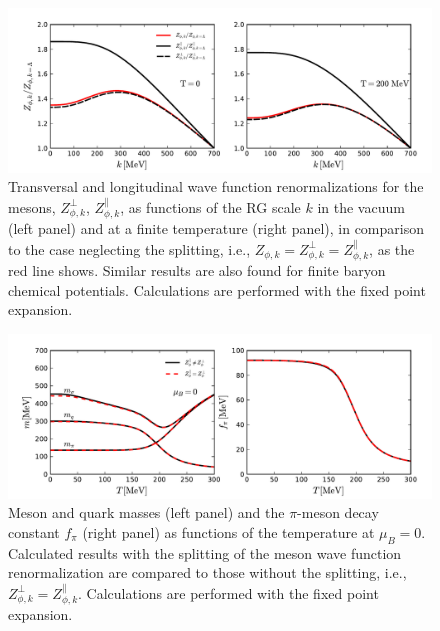 \documentclass[%
reprint,
superscriptaddress,
showpacs,preprintnumbers,
 amsmath,amssymb,
 aps,
prd,
]{revtex4-1}
\begin{document}
%
\begin{figure}[t]
\includegraphics[width=1\textwidth]{zphi}
\caption{Transversal and longitudinal wave function renormalizations for the mesons, $Z_{\phi,k}^{\perp}$, $Z_{\phi,k}^{\parallel}$, as functions of the RG scale $k$ in the vacuum (left panel) and at a finite temperature (right panel), in comparison to the case neglecting the splitting, i.e., $Z_{\phi,k}=Z_{\phi,k}^{\perp}=Z_{\phi,k}^{\parallel}$, as the red line shows. Similar results are also found for finite baryon chemical potentials. Calculations are performed with the fixed point expansion.}\label{fig:zphi}
\end{figure}
%

%
\begin{figure}[t]
\includegraphics[width=1\textwidth]{mfpi}
\caption{Meson and quark masses (left panel) and the $\pi$-meson decay constant $f_\pi$ (right panel) as functions of the temperature at $\mu_B=0$. Calculated results with the splitting of the meson wave function renormalization are compared to those without the splitting, i.e., $Z_{\phi,k}^{\perp}=Z_{\phi,k}^{\parallel}$. Calculations are performed with the fixed point expansion.}\label{fig:mfpi}
\end{figure}
%
\end{document}
